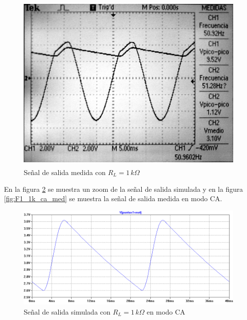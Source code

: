 \documentclass[10pt,spanish,a4paper,openany,notitlepage]{article}
\begin{document}
\begin{enumerate}
    \begin{figure}[H]
    \centering
    \includegraphics[width=350pt, height=250pt]{mediciones/F1-1K.jpg}
    \caption{Señal de salida medida con $R_L = 1\,\unit{k\Omega}$}
    \label{fig:F1_1k_cc_med}
    \end{figure}
    
    En la figura \ref{fig:F1_1k_ca_sim} se muestra un zoom de la señal de salida simulada y en
    la figura \ref{fig:F1_1k_ca_med} se muestra la señal de salida medida en modo CA.
    
    \begin{figure}[H]
    \centering
    \includegraphics[scale=0.65]{simulaciones/F1_vo_RL-1k_zoom.png}
    \caption{Señal de salida simulada con $R_L = 1\,\unit{k\Omega}$ en modo CA}
    \label{fig:F1_1k_ca_sim}
    \end{figure}
    

\end{enumerate}
\end{document}
